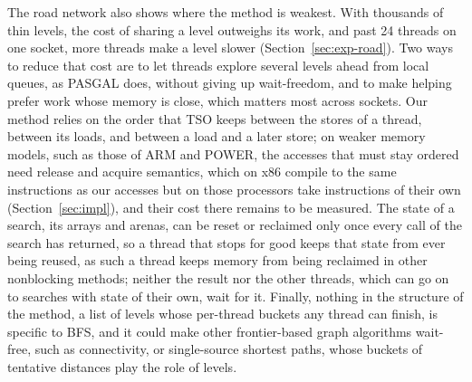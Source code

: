 The road network also shows where the method is weakest. With thousands of thin levels, the cost of sharing a level outweighs its work, and past 24 threads on one socket, more threads make a level slower (Section~\ref{sec:exp-road}). Two ways to reduce that cost are to let threads explore several levels ahead from local queues, as PASGAL does, without giving up wait-freedom, and to make helping prefer work whose memory is close, which matters most across sockets. Our method relies on the order that TSO keeps between the stores of a thread, between its loads, and between a load and a later store; on weaker memory models, such as those of ARM and POWER, the accesses that must stay ordered need release and acquire semantics, which on x86 compile to the same instructions as our accesses but on those processors take instructions of their own (Section~\ref{sec:impl}), and their cost there remains to be measured. The state of a search, its arrays and arenas, can be reset or reclaimed only once every call of the search has returned, so a thread that stops for good keeps that state from ever being reused, as such a thread keeps memory from being reclaimed in other nonblocking methods; neither the result nor the other threads, which can go on to searches with state of their own, wait for it. Finally, nothing in the structure of the method, a list of levels whose per-thread buckets any thread can finish, is specific to BFS, and it could make other frontier-based graph algorithms wait-free, such as connectivity, or single-source shortest paths, whose buckets of tentative distances play the role of levels.
